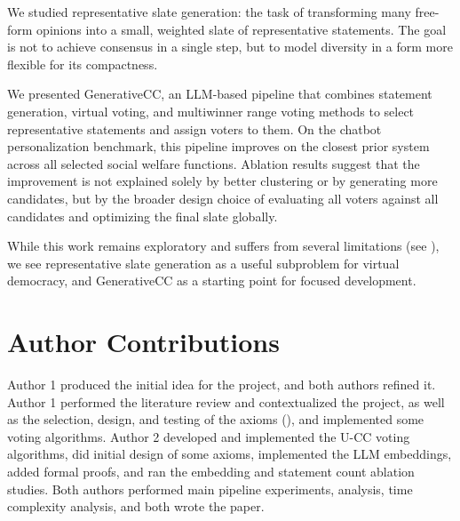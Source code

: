 \documentclass[letterpaper]{article} %
\begin{document}
We studied representative slate generation: the task of transforming many free-form opinions into a small, weighted slate of representative statements.
The goal is not to achieve consensus in a single step, but to model  diversity in a form more flexible for its compactness.

We presented GenerativeCC, an LLM-based pipeline that combines statement generation, virtual voting, and multiwinner range voting methods to select representative statements and assign voters to them.
On the chatbot personalization benchmark, this pipeline improves on the closest prior system across all selected social welfare functions.
Ablation results suggest that the improvement is not explained solely by better clustering or by generating more candidates, but by the broader design choice of evaluating all voters against all candidates and optimizing the final slate globally.

While this work remains exploratory and suffers from several limitations (see ), we see representative slate generation as a useful subproblem for virtual democracy, and GenerativeCC as a starting point for focused development.




\appendix


\section{Author Contributions}

Author 1 produced the initial idea for the project, and both authors refined it.
Author 1 performed the literature review and contextualized the project, as well as the selection, design, and testing of the axioms (), and implemented some voting algorithms.
Author 2 developed and implemented the \textsc{U-CC} voting algorithms, did initial design of some axioms, implemented the LLM embeddings, added formal proofs, and ran the embedding and statement count ablation studies.
Both authors performed main pipeline experiments, analysis, time complexity analysis, and both wrote the paper.
\end{document}
